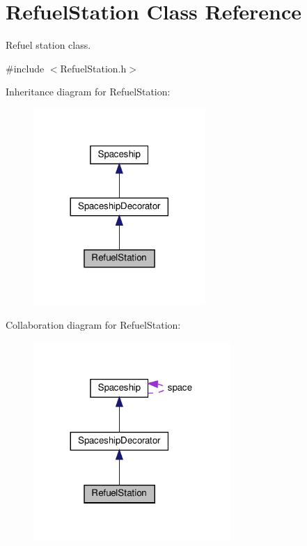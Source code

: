 \hypertarget{classRefuelStation}{}\section{Refuel\+Station Class Reference}
\label{classRefuelStation}


Refuel station class.  




{\ttfamily \#include $<$Refuel\+Station.\+h$>$}



Inheritance diagram for Refuel\+Station\+:\nopagebreak
\begin{figure}[H]
\begin{center}
\leavevmode
\includegraphics[width=185pt]{classRefuelStation__inherit__graph}
\end{center}
\end{figure}


Collaboration diagram for Refuel\+Station\+:\nopagebreak
\begin{figure}[H]
\begin{center}
\leavevmode
\includegraphics[width=212pt]{classRefuelStation__coll__graph}
\end{center}
\end{figure}
